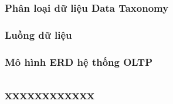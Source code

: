 \documentclass{beamer}
\begin{document}
\subsubsection{Phân loại dữ liệu Data Taxonomy}
\subsubsection{Luồng dữ liệu}
\subsubsection{Mô hình ERD hệ thống OLTP}

\subsection{xxxxxxxxxxxx}

\end{document}
